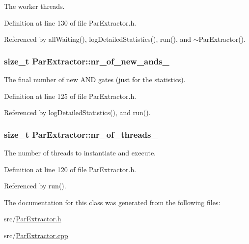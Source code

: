 The worker threads. 



Definition at line 130 of file Par\-Extractor.\-h.



Referenced by all\-Waiting(), log\-Detailed\-Statistics(), run(), and $\sim$\-Par\-Extractor().

\hypertarget{classParExtractor_acc46c480f31bd444d15c3f68b2392868}{
\subsubsection[{nr\-\_\-of\-\_\-new\-\_\-ands\-\_\-}]{\setlength{\rightskip}{0pt plus 5cm}size\-\_\-t Par\-Extractor\-::nr\-\_\-of\-\_\-new\-\_\-ands\-\_\-\hspace{0.3cm}{\ttfamily [protected]}}}\label{classParExtractor_acc46c480f31bd444d15c3f68b2392868}


The final number of new A\-N\-D gates (just for the statistics). 



Definition at line 125 of file Par\-Extractor.\-h.



Referenced by log\-Detailed\-Statistics(), and run().

\hypertarget{classParExtractor_af95f31bb7e0c7c6f8063dfb23736c8e9}{
\subsubsection[{nr\-\_\-of\-\_\-threads\-\_\-}]{\setlength{\rightskip}{0pt plus 5cm}size\-\_\-t Par\-Extractor\-::nr\-\_\-of\-\_\-threads\-\_\-\hspace{0.3cm}{\ttfamily [protected]}}}\label{classParExtractor_af95f31bb7e0c7c6f8063dfb23736c8e9}


The number of threads to instantiate and execute. 



Definition at line 120 of file Par\-Extractor.\-h.



Referenced by run().



The documentation for this class was generated from the following files\-:\begin{DoxyCompactItemize}
\item 
src/\hyperlink{ParExtractor_8h}{Par\-Extractor.\-h}\item 
src/\hyperlink{ParExtractor_8cpp}{Par\-Extractor.\-cpp}\end{DoxyCompactItemize}
